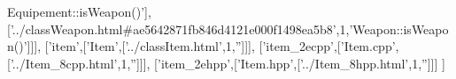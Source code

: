 \begin{DoxyCode}
{      Equipement::isWeapon()'}],[\textcolor{stringliteral}{'../classWeapon.html#ae5642871fb846d4121e000f1498ea5b8'},1,\textcolor{stringliteral}{'Weapon::isWeapon()'}]]],
  [\textcolor{stringliteral}{'item'},[\textcolor{stringliteral}{'Item'},[\textcolor{stringliteral}{'../classItem.html'},1,\textcolor{stringliteral}{''}]]],
  [\textcolor{stringliteral}{'item\_2ecpp'},[\textcolor{stringliteral}{'Item.cpp'},[\textcolor{stringliteral}{'../Item\_8cpp.html'},1,\textcolor{stringliteral}{''}]]],
  [\textcolor{stringliteral}{'item\_2ehpp'},[\textcolor{stringliteral}{'Item.hpp'},[\textcolor{stringliteral}{'../Item\_8hpp.html'},1,\textcolor{stringliteral}{''}]]]
]
\end{DoxyCode}
